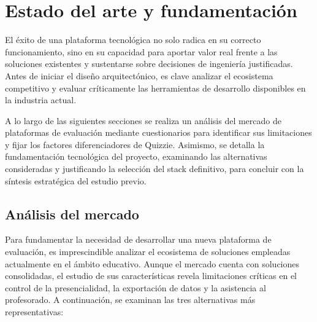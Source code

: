 \chapter{Estado del arte y fundamentación}\label{cap:estado_del_arte_y_fundamentacion}

El éxito de una plataforma tecnológica no solo radica en su correcto funcionamiento, sino en su capacidad para aportar valor real frente a las soluciones existentes y sustentarse sobre decisiones de ingeniería justificadas. Antes de iniciar el diseño arquitectónico, es clave analizar el ecosistema competitivo y evaluar críticamente las herramientas de desarrollo disponibles en la industria actual.

A lo largo de las siguientes secciones se realiza un análisis del mercado de plataformas de evaluación mediante cuestionarios para identificar sus limitaciones y fijar los factores diferenciadores de Quizzie. Asimismo, se detalla la fundamentación tecnológica del proyecto, examinando las alternativas consideradas y justificando la selección del stack definitivo, para concluir con la síntesis estratégica del estudio previo.

\section{Análisis del mercado}\label{sec:analisis_del_mercado}

Para fundamentar la necesidad de desarrollar una nueva plataforma de evaluación, es imprescindible analizar el ecosistema de soluciones empleadas actualmente en el ámbito educativo. Aunque el mercado cuenta con soluciones consolidadas, el estudio de sus características revela limitaciones críticas en el control de la presencialidad, la exportación de datos y la asistencia al profesorado. A continuación, se examinan las tres alternativas más representativas:

